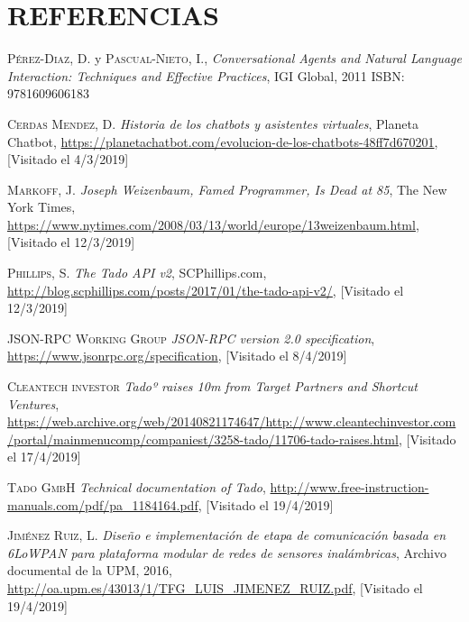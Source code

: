 \documentclass[spanish,12pt, a4paper, twoside]{paper}
\let\oldsection\section
\def\section{\cleardoublepage\oldsection}
\begin{document}
\newpage

\section{REFERENCIAS}
\begingroup
\renewcommand{\section}[2]{}%
\begin{thebibliography}{00}
 \textsc{Pérez-Diaz, D.} y \textsc{Pascual-Nieto, I.},
	\textit{Conversational Agents and Natural Language Interaction: Techniques and Effective Practices}, IGI Global, 2011 ISBN: 9781609606183
	
 \textsc{Cerdas Mendez, D.}
	\textit{Historia de los chatbots y asistentes virtuales}, Planeta Chatbot, \url{https://planetachatbot.com/evolucion-de-los-chatbots-48ff7d670201}, [Visitado el 4/3/2019]
	
 \textsc{Markoff, J.}
	\textit{Joseph Weizenbaum, Famed Programmer, Is Dead at 85}, The New York Times, \url{https://www.nytimes.com/2008/03/13/world/europe/13weizenbaum.html}, [Visitado el 12/3/2019]
	
 \textsc{Phillips, S.}
	\textit{The Tado API v2}, SCPhillips.com, \url{http://blog.scphillips.com/posts/2017/01/the-tado-api-v2/}, [Visitado el 12/3/2019]
	
 \textsc{JSON-RPC Working Group} \textit{JSON-RPC version 2.0 specification}, \url{https://www.jsonrpc.org/specification}, [Visitado el 8/4/2019]

 \textsc{Cleantech investor} \textit{Tadoº raises \texteuro10m from Target Partners and Shortcut Ventures}, \url{https://web.archive.org/web/20140821174647/http://www.cleantechinvestor.com/portal/mainmenucomp/companiest/3258-tado/11706-tado-raises.html}, [Visitado el 17/4/2019]

 \textsc{Tado GmbH} \textit{Technical documentation of Tado}, \url{http://www.free-instruction-manuals.com/pdf/pa_1184164.pdf}, [Visitado el 19/4/2019]

 \textsc{Jiménez Ruiz, L.} \textit{Diseño e implementación de etapa de comunicación basada en 6LoWPAN para plataforma modular de redes de sensores inalámbricas}, Archivo documental de la UPM, 2016, \url{http://oa.upm.es/43013/1/TFG_LUIS_JIMENEZ_RUIZ.pdf}, [Visitado el 19/4/2019]


\end{thebibliography}
\end{document}
